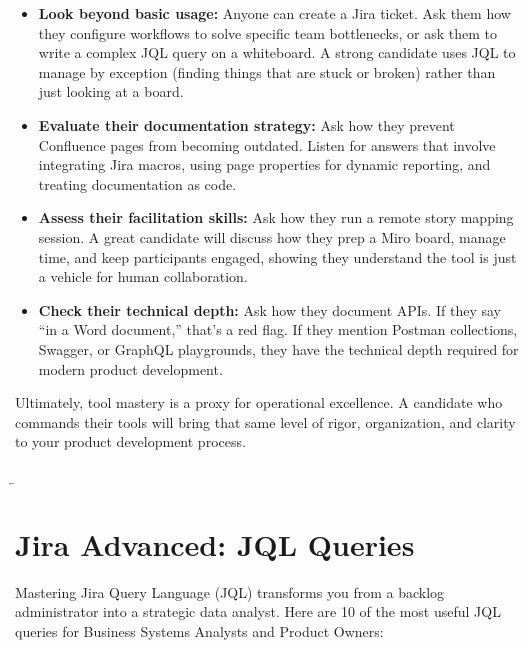 \begin{itemize}
\tightlist
\item
  \textbf{Look beyond basic usage:} Anyone can create a Jira ticket. Ask
  them how they configure workflows to solve specific team bottlenecks,
  or ask them to write a complex JQL query on a whiteboard. A strong
  candidate uses JQL to manage by exception (finding things that are
  stuck or broken) rather than just looking at a board.
\item
  \textbf{Evaluate their documentation strategy:} Ask how they prevent
  Confluence pages from becoming outdated. Listen for answers that
  involve integrating Jira macros, using page properties for dynamic
  reporting, and treating documentation as code.
\item
  \textbf{Assess their facilitation skills:} Ask how they run a remote
  story mapping session. A great candidate will discuss how they prep a
  Miro board, manage time, and keep participants engaged, showing they
  understand the tool is just a vehicle for human collaboration.
\item
  \textbf{Check their technical depth:} Ask how they document APIs. If
  they say ``in a Word document,'' that's a red flag. If they mention
  Postman collections, Swagger, or GraphQL playgrounds, they have the
  technical depth required for modern product development.
\end{itemize}

Ultimately, tool mastery is a proxy for operational excellence. A
candidate who commands their tools will bring that same level of rigor,
organization, and clarity to your product development process.

\b

\section{Jira Advanced: JQL Queries}\label{jira-advanced-jql-queries}

Mastering Jira Query Language (JQL) transforms you from a backlog
administrator into a strategic data analyst. Here are 10 of the most
useful JQL queries for Business Systems Analysts and Product Owners:

